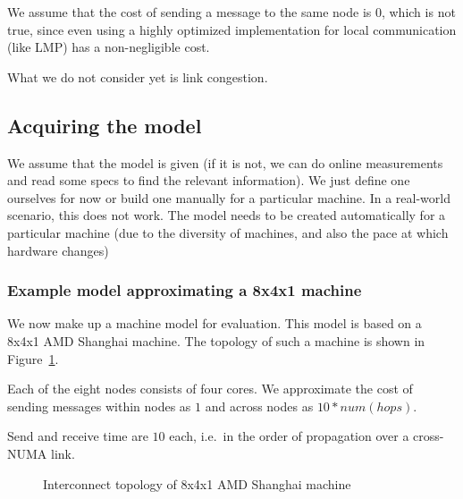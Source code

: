 \documentclass{article}
\begin{document}
We assume that the cost of sending a message to the same node is 0,
which is not true, since even using a highly optimized implementation
for local communication (like LMP) has a non-negligible cost.

What we do not consider yet is link congestion. 

\subsection{Acquiring the model}

We assume that the model is given (if it is not, we can do online
measurements and read some specs to find the relevant information). We
just define one ourselves for now or build one manually for a
particular machine. In a real-world scenario, this does not work. The
model needs to be created automatically for a particular machine (due
to the diversity of machines, and also the pace at which hardware changes)

\subsubsection{Example model approximating a 8x4x1 machine}
\label{sec:example_model}

We now make up a machine model for evaluation. This model is based on
a 8x4x1 AMD Shanghai machine. The topology of such a machine is shown
in Figure~\ref{fig:gruyere}.

Each of the eight nodes consists of four cores. We approximate the
cost of sending messages within nodes as $1$ and across nodes as
$10*num(hops)$.

Send and receive time are $10$ each, i.e.\ in the order of propagation
over a cross-NUMA link.

\begin{figure}[htb]
  \centering
  \caption{Interconnect topology of 8x4x1 AMD Shanghai machine}
  \label{fig:gruyere}
\end{figure}
\end{document}
